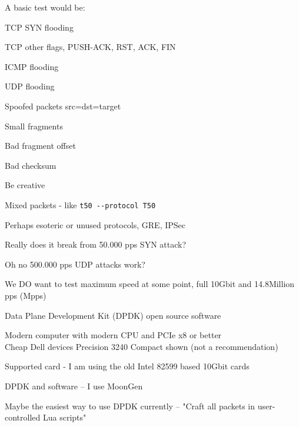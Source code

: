 \documentclass[Screen16to9,17pt]{foils}
\begin{document}

A basic test would be:
\begin{list2}
\item TCP SYN flooding
\item TCP other flags, PUSH-ACK, RST, ACK, FIN
\item ICMP flooding
\item UDP flooding
\item Spoofed packets src=dst=target \smiley
\item Small fragments
\item Bad fragment offset
\item Bad checksum
\item Be creative
\item Mixed packets - like \verb+t50 --protocol T50+
\item Perhaps esoteric or unused protocols, GRE, IPSec
\end{list2}




\centerline{Really does it break from 50.000 pps SYN attack?}



\centerline{Oh no 500.000 pps UDP attacks work?}





\begin{list2}
\item We DO want to test maximum speed at some point, full 10Gbit and 14.8Million pps (Mpps)
\item Data Plane Development Kit (DPDK) open source software\\
\item Modern computer with modern CPU and PCIe x8 or better\\
Cheap Dell devices Precision 3240 Compact shown (not a recommendation)
\item Supported card - I am using the old Intel 82599 based 10Gbit cards
\item DPDK and software -- I use MoonGen 
\item Maybe the easiest way to use DPDK currently -- "Craft all packets in user-controlled Lua scripts"
\end{list2}
\end{document}
